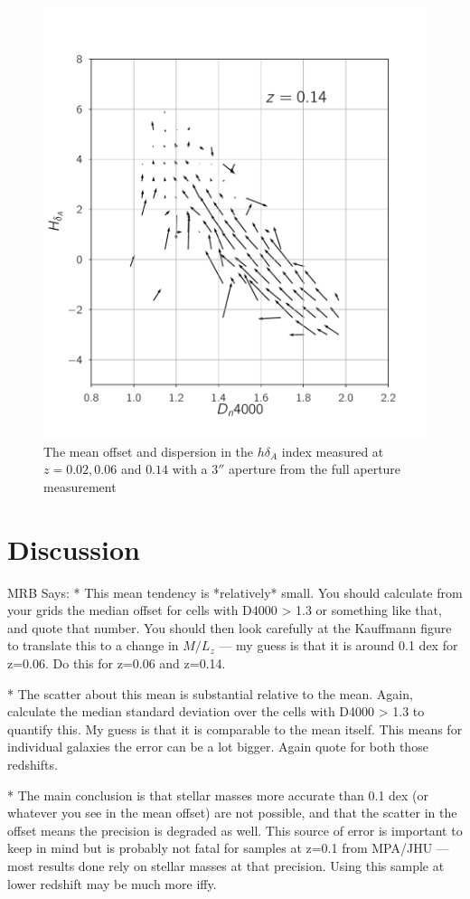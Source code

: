 \begin{figure}
\includegraphics[width=\textwidth]{figures/quiver_c.pdf}
\caption[Short figure name.]{ The mean offset and dispersion in the $h\delta_{A}$ index measured at $z = 0.02,0.06$ and $0.14$ with a $3''$ aperture from the full aperture measurement 
\label{fig:myInlineFigure}}
\end{figure}

\section{Discussion}

MRB Says: * This mean tendency is *relatively* small. You should calculate from your grids the median offset for cells with D4000 > 1.3 or something like that, and quote that number. You should then look carefully at the Kauffmann figure to translate this to a change in $M/L_z$ --- my guess is that it is around 0.1 dex for z=0.06. Do this for z=0.06 and z=0.14.

 * The scatter about this mean is substantial relative to
 the mean. Again, calculate the median standard deviation
 over the cells with D4000 > 1.3 to quantify this. My guess
 is that it is  comparable to the mean itself. This means
 for individual galaxies the error can be a lot bigger.
 Again quote for both those redshifts.

 * The main conclusion is that stellar masses more accurate
than 0.1 dex (or whatever you see in the mean offset) are
not possible, and that the scatter in the offset means the
precision is degraded as well. This source of error is important
to keep in mind but is probably not fatal for samples at z=0.1
from MPA/JHU --- most results done rely on stellar masses
at that precision. Using this sample at lower redshift may be
much more iffy.







